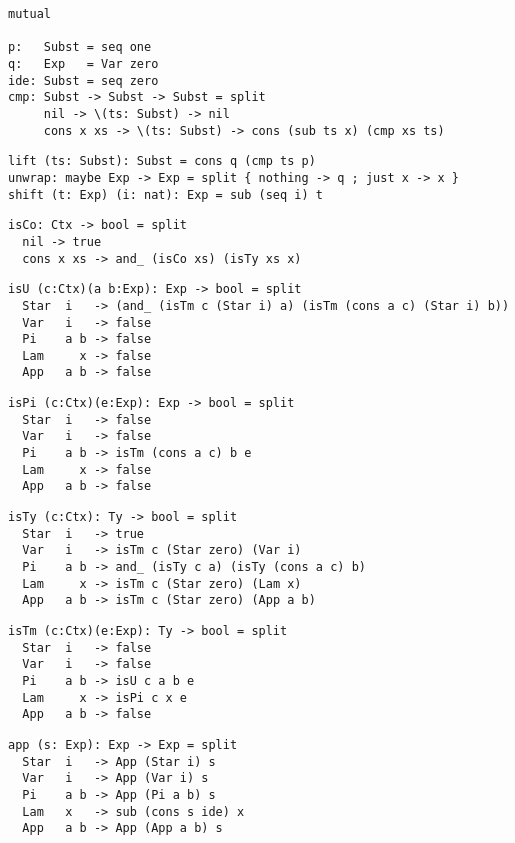 \documentclass{article}
\begin{document}
\begin{lstlisting}[mathescape=true]
mutual

p:   Subst = seq one
q:   Exp   = Var zero
ide: Subst = seq zero
cmp: Subst -> Subst -> Subst = split
     nil -> \(ts: Subst) -> nil
     cons x xs -> \(ts: Subst) -> cons (sub ts x) (cmp xs ts)
\end{lstlisting}

\begin{lstlisting}[mathescape=true]
lift (ts: Subst): Subst = cons q (cmp ts p)
unwrap: maybe Exp -> Exp = split { nothing -> q ; just x -> x }
shift (t: Exp) (i: nat): Exp = sub (seq i) t
\end{lstlisting}

\begin{lstlisting}[mathescape=true]
isCo: Ctx -> bool = split
  nil -> true
  cons x xs -> and_ (isCo xs) (isTy xs x)
\end{lstlisting}

\begin{lstlisting}[mathescape=true]
isU (c:Ctx)(a b:Exp): Exp -> bool = split
  Star  i   -> (and_ (isTm c (Star i) a) (isTm (cons a c) (Star i) b))
  Var   i   -> false
  Pi    a b -> false
  Lam     x -> false
  App   a b -> false
\end{lstlisting}

\begin{lstlisting}[mathescape=true]
isPi (c:Ctx)(e:Exp): Exp -> bool = split
  Star  i   -> false
  Var   i   -> false
  Pi    a b -> isTm (cons a c) b e
  Lam     x -> false
  App   a b -> false
\end{lstlisting}

\begin{lstlisting}[mathescape=true]
isTy (c:Ctx): Ty -> bool = split
  Star  i   -> true
  Var   i   -> isTm c (Star zero) (Var i)
  Pi    a b -> and_ (isTy c a) (isTy (cons a c) b)
  Lam     x -> isTm c (Star zero) (Lam x)
  App   a b -> isTm c (Star zero) (App a b)
\end{lstlisting}

\begin{lstlisting}[mathescape=true]
isTm (c:Ctx)(e:Exp): Ty -> bool = split
  Star  i   -> false
  Var   i   -> false
  Pi    a b -> isU c a b e
  Lam     x -> isPi c x e
  App   a b -> false
\end{lstlisting}

\begin{lstlisting}[mathescape=true]
app (s: Exp): Exp -> Exp = split
  Star  i   -> App (Star i) s
  Var   i   -> App (Var i) s
  Pi    a b -> App (Pi a b) s
  Lam   x   -> sub (cons s ide) x
  App   a b -> App (App a b) s
\end{lstlisting}
\end{document}

